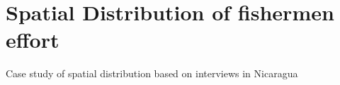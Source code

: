 \documentclass[]{article}
\begin{document}
\section{Spatial Distribution of fishermen effort}

\begin{description}
\itemsep1pt\parskip0pt
\item[\citet{Daw2008}]
Case study of spatial distribution based on interviews in Nicaragua
\end{description}


\end{document}
